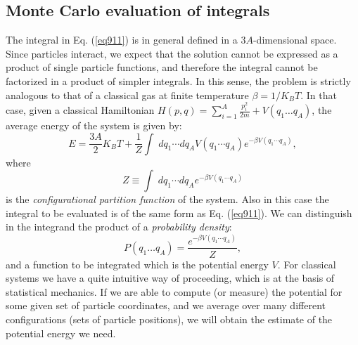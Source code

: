\subsection{Monte Carlo evaluation of integrals}
The integral in Eq. (\ref{eq911}) is in general defined in a $3A$-dimensional space. Since particles interact, we expect that the solution cannot be expressed as a product of single particle functions, and therefore the integral cannot be factorized in a product of simpler integrals. In this sense, the problem is strictly analogous to that of a classical gas at finite temperature $\beta=1/{K_B T}$. In that case, given a classical Hamiltonian $H(p,q)=\sum_{i=1}^{A}\frac{p_i^2}{2m}+V(q_1\dots q_A)$, the average energy of the system is given by:
\begin{equation}
E=\frac{3A}{2}K_B T+\frac{1}{Z}\int\;dq_1\cdots dq_A V(q_1\cdots q_A)e^{-\beta V(q_1\cdots q_A)},
\end{equation}
where 
\begin{equation}
Z\equiv\int\;dq_1\cdots dq_A e^{-\beta V(q_1\cdots q_A)}
\end{equation}
is the {\it configurational partition function} of the system. Also in this case the integral to be evaluated is of the same form as Eq. (\ref{eq911}). We can distinguish in the integrand the product of a {\it probability density}:
\begin{equation}
P(q_1\dots q_A)=\frac{e^{-\beta V(q_1\cdots q_A)}}{Z},
\end{equation}
and a function to be integrated which is the potential energy $V$. For classical systems we have a quite intuitive way of proceeding, which is at the basis of statistical mechanics. If we are able to compute (or measure) the potential for some given set of particle coordinates, and we average over many different configurations (sets of particle positions), we will obtain the estimate of the potential energy we need. 

